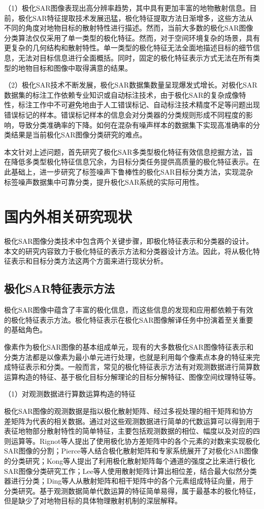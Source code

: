 （1）极化SAR图像表现出高分辨率趋势，其中具有更加丰富的地物散射信息。目前，极化SAR特征提取技术发展迅猛，极化特征提取方法日渐增多，这些方法从不同的角度对地物目标的散射特性进行描述。然而，当前大多数的极化SAR图像分类算法仅仅采用了单一类型的极化特征。然而，对于空间环境复杂的场景，具有更复杂的几何结构和散射特性。单一类型的极化特征无法全面地描述目标的细节信息，无法对目标信息进行全面概括。同时，固定的极化特征表示方式无法在所有类型的地物目标和图像中取得满意的结果。

（2）极化SAR技术不断发展，极化SAR数据集数量呈现爆发式增长。对极化SAR数据集的标注工作依赖专业知识或自动标注技术，由于极化SAR的复杂成像特性，标注工作中不可避免地由于人工错误标记、自动标注技术精度不足等问题出现错误标记的样本。错误标记样本的信息会对分类器的分类规则形成不同程度的影响，导致分类准确率的下降。如何在混杂有噪声样本的数据集下实现高准确率的分类结果是当前极化SAR图像分类研究的难点。

本文针对上述问题，首先研究了极化SAR多类型极化特征有效信息挖掘方法，旨在降低多类型极化特征信息冗余，为目标分类任务提供高质量的极化特征表示。在此基础上，进一步研究了标签噪声下鲁棒性的极化SAR目标分类方法，实现混杂标签噪声数据集中可靠分类，提升极化SAR系统的实际可用性。

\section{国内外相关研究现状}
极化SAR图像分类技术中包含两个关键步骤，即极化特征表示和分类器的设计。本文的研究内容致力于极化特征的表示方法和分类器设计方法。因此，将从极化特征表示和目标分类方法这两个方面来进行现状分析。

\subsection{极化SAR特征表示方法}
极化SAR图像中蕴含了丰富的极化信息，而这些信息的发现和应用都依赖于有效的极化特征表示方法。极化特征表示在极化SAR图像解译任务中扮演着至关重要的基础角色。

像素作为极化SAR图像的基本组成单元，现有的大多数极化SAR图像特征表示和分类方法都是以像素为最小单元进行处理，也就是利用每个像素点本身的特征来完成特征表示和分类。一般而言，常见的极化特征表示方法有对观测数据进行简算数运算构造的特征、基于极化目标分解理论的目标分解特征、图像空间纹理特征等。

（1）对观测数据进行算数运算构造的特征

极化SAR图像的观测数据是指以极化散射矩阵、经过多视处理的相干矩阵和协方差矩阵为代表的相关数据。通过对这些观测数据进行简单的代数运算可以得到用于表征地物部分散射特性的简单特征，主要包括观测数据的相位、幅度以及对应的四则运算等。Rignot等人提出了使用极化协方差矩阵中的各个元素的对数来实现极化SAR图像的分割；Pierce等人结合极化散射矩阵和专家系统展开了对极化SAR图像的分类研究；Kong等人提出了利用极化散射矩阵每个通道的强度之比来进行极化SAR图像分类研究工作；Lee等人使用散射矩阵计算出相位差，结合最大似然分类器进行分类；Ding等人从散射矩阵和相干矩阵中的各个元素组成特征向量，用于分类研究。基于观测数据简单代数运算的特征简单易得，属于最基本的极化特征，但是缺少了对地物目标的具体物理散射机制的深层解释。

